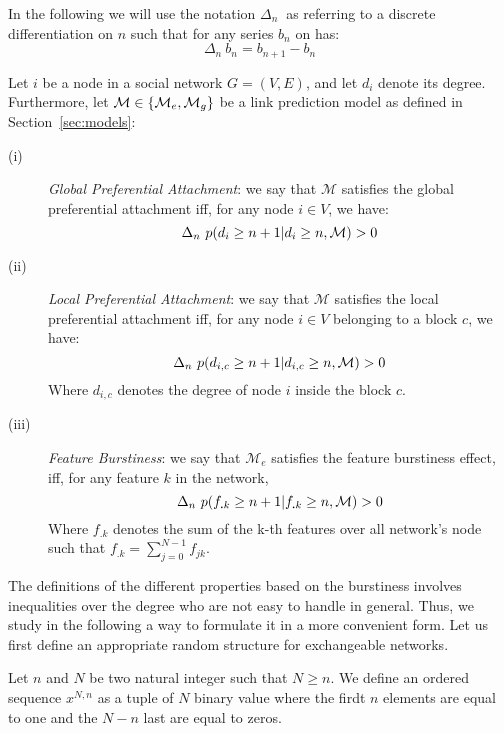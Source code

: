In the following we will use the notation $\Delta_n\ $ as referring to a discrete differentiation on $n$ such that for any series $b_n$ on has:
\begin{equation*}
    \Delta_n\  b_n = b_{n+1} - b_n
\end{equation*}


\begin{definition}
Let $i$ be a node in a social network $G=(V,E)$, and let $d_i$ denote its degree. Furthermore, let $\mathcal{M} \in \{\mathcal{M}_e, \mathcal{M}_g\}$ be a link prediction model as defined in Section~\ref{sec:models}: 
\begin{description}
\item[(i)] \emph{Global Preferential Attachment}: we say that $\mathcal{M}$ satisfies the global preferential attachment iff, for any node $i \in V$, we have:
 \begin{equation}
 \Delta_n\  p(d_i \geq n+1 | d_i \geq n,  \mathcal{M}) > 0
 \end{equation}
\item[(ii)] \emph{Local Preferential Attachment}: we say that $\mathcal{M}$ satisfies the local preferential attachment iff, for any node $i \in V$  belonging to a block $c$, we have:
  \begin{equation}
 \Delta_n\  p(d_{i,c} \geq n+1 | d_{i,c} \geq n,  \mathcal{M}) > 0
 \end{equation}
  Where $d_{i,c}$ denotes the degree of node $i$ inside the block $c$.
\item[(iii)] \emph{Feature Burstiness}: we say that $\mathcal{M}_e$ satisfies the feature burstiness effect, iff, for any feature $k$ in the network,   
  \begin{equation}
	\Delta_n\  p(f_{\bm{.}k} \geq n+1 | f_{\bm{.}k} \geq n,  \mathcal{M}) > 0
  \end{equation}
   Where $f_{\bm{.}k}$ denotes the sum of the k-th features over all network's node such that $f_{\bm{.}k} = \sum_{j=0}^{N-1} f_{jk}$.
\end{description}
\label{def:burst-soc-net}
\end{definition}
%
The definitions of the different properties based on the burstiness involves inequalities over the degree who are not easy to handle in general. Thus, we study in the following a way to formulate it in a more convenient form. Let us first define an appropriate random structure for exchangeable networks.

\begin{definition}
    Let $n$ and $N$ be two natural integer such that $N \geq n$. We define an ordered sequence $x^{N,n}$ as a tuple of $N$ binary value where the firdt $n$ elements are equal to one and the $N-n$ last are equal to zeros.
	\label{def:rd_struct}
\end{definition}

